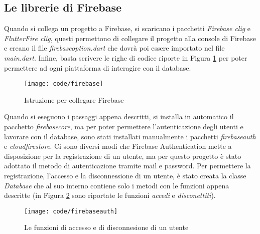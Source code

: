 \newpage

\subsection{Le librerie di Firebase}
Quando si collega un progetto a Firebase, si scaricano i pacchetti \emph{Firebase \gls{clig}} e \emph{FlutterFire \gls{clig}}, questi permettono di collegare il progetto alla console di Firebase e creano il file \emph{firebase\textunderscore option.dart} che dovrà poi essere importato nel file \emph{main.dart}.\newline
Infine, basta scrivere le righe di codice riporte in Figura \ref{fig:code-firebase} per poter permettere ad ogni piattaforma di interagire con il database.
\begin{figure}[!h] 
    \centering 
    \texttt{[image: code/firebase]} 
    \caption{Istruzione per collegare Firebase}
    \label{fig:code-firebase}
\end{figure}

Quando si eseguono i passaggi appena descritti, si installa in automatico il pacchetto \emph{firebase\textunderscore core}, ma per poter permettere l'autenticazione degli utenti e lavorare con il database, sono stati installati manualmente i pacchetti \emph{firebase\textunderscore auth} e \emph{cloud\textunderscore firestore}.\newline
\newline
Ci sono diversi modi che Firebase Authentication mette a disposizione per la registrazione di un utente, ma per questo progetto è stato adottato il metodo di autenticazione tramite mail e password.\newline
Per permettere la registrazione, l'accesso e la disconnessione di un utente, è stato creata la classe \emph{Database} che al suo interno contiene solo i metodi con le funzioni appena descritte (in Figura \ref{fig:code-authentication} sono riportate le funzioni \emph{accedi} e \emph{disconettiti}).
\begin{figure}[!h] 
    \centering 
    \texttt{[image: code/firebaseauth]} 
    \caption{Le funzioni di accesso e di disconnesione di un utente}
    \label{fig:code-authentication}
\end{figure}

\newpage


